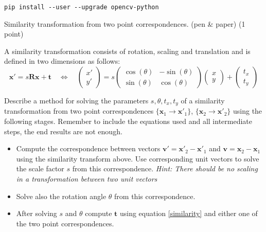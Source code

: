 \documentclass[12pt]{article} %
\newenvironment{exercise}[2][Task]{\begin{trivlist}
\item[\hskip \labelsep {\bfseries #1}\hskip \labelsep {\bfseries #2.}]}{\end{trivlist}}
\begin{document}
\verb|pip install --user --upgrade opencv-python|
\newline



\begin{exercise}{1}
Similarity transformation from two point correspondences. (pen \& paper)  (1 point)

\noindent A similarity transformation consists of rotation, scaling and translation and is defined in two dimensions as follows:
\begin{equation}\label{similarity}
\mathbf{x}'=s\mathbf{R}\mathbf{x}+\mathbf{t} \quad \Leftrightarrow \quad
\begin{pmatrix} x'\\ y'\end{pmatrix}=s\begin{pmatrix}\cos(\theta) & -\sin(\theta)\\ \sin(\theta) & \cos(\theta) \end{pmatrix}\begin{pmatrix}x \\ y\end{pmatrix} + \begin{pmatrix}t_x \\ t_y\end{pmatrix} 
\end{equation}

\noindent Describe a method for solving the parameters $s,\theta,t_x,t_y$ of a similarity transformation from two point correspondences $\{\mathbf{x}_1\rightarrow \mathbf{x}'_1\}$, $\{\mathbf{x}_2\rightarrow\mathbf{x}'_2\}$ using the following stages. Remember to include the equations used and all intermediate steps, the end results are not enough.
\begin{itemize}
\item[\textit{a)}] Compute the correspondence between vectors $\mathbf{v}'=\mathbf{x}'_2-\mathbf{x}'_1$ and $\mathbf{v}=\mathbf{x}_2-\mathbf{x}_1$ using the similarity transform above. Use corresponding unit vectors to solve the scale factor $s$ from this correspondence. \textit{Hint: There should be no scaling in a transformation between two unit vectors}

\item[\textit{b)}] Solve also the rotation angle $\theta$ from this correspondence.

\item[\textit{c)}] After solving $s$ and $\theta$ compute $\mathbf{t}$ using equation \eqref{similarity} and either one of the two point correspondences.


\end{itemize}
\end{exercise}
\end{document}
